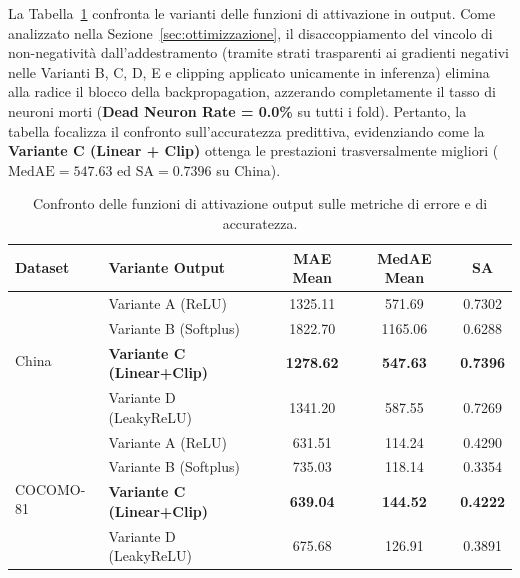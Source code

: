 \documentclass[11pt, a4paper]{article}
\begin{document}
La Tabella~\ref{tab:deadneurons} confronta le varianti delle funzioni di attivazione in output. Come analizzato nella Sezione~\ref{sec:ottimizzazione}, il disaccoppiamento del vincolo di non-negatività dall'addestramento (tramite strati trasparenti ai gradienti negativi nelle Varianti B, C, D, E e clipping applicato unicamente in inferenza) elimina alla radice il blocco della backpropagation, azzerando completamente il tasso di neuroni morti (\textbf{Dead Neuron Rate = 0.0\%} su tutti i fold). Pertanto, la tabella focalizza il confronto sull'accuratezza predittiva, evidenziando come la \textbf{Variante C (Linear + Clip)} ottenga le prestazioni trasversalmente migliori ($\text{MedAE} = 547.63$ ed $\text{SA} = 0.7396$ su China).

\begin{table}[htbp]
    \centering
    \caption{Confronto delle funzioni di attivazione output sulle metriche di errore e di accuratezza.}\label{tab:deadneurons}
    \small
    \begin{tabular}{llccc}
        \toprule
        \rowcolor{tableheader} \textbf{Dataset} & \textbf{Variante Output}          & \textbf{MAE Mean} & \textbf{MedAE Mean} & \textbf{SA}     \\
        \midrule
        \multirow{4}{*}{China}                  & Variante A (ReLU)                 & 1325.11           & 571.69              & 0.7302          \\
                                                & Variante B (Softplus)             & 1822.70           & 1165.06             & 0.6288          \\
                                                & \textbf{Variante C (Linear+Clip)} & \textbf{1278.62}  & \textbf{547.63}     & \textbf{0.7396} \\
                                                & Variante D (LeakyReLU)            & 1341.20           & 587.55              & 0.7269          \\
        \midrule
        \multirow{4}{*}{COCOMO-81}              & Variante A (ReLU)                 & 631.51            & 114.24              & 0.4290          \\
                                                & Variante B (Softplus)             & 735.03            & 118.14              & 0.3354          \\
                                                & \textbf{Variante C (Linear+Clip)} & \textbf{639.04}   & \textbf{144.52}     & \textbf{0.4222} \\
                                                & Variante D (LeakyReLU)            & 675.68            & 126.91              & 0.3891          \\
        \bottomrule
    \end{tabular}
\end{table}
\end{document}
